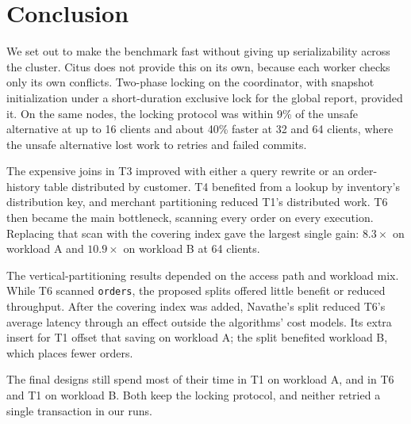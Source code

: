 \documentclass[sigconf,10pt,nonacm]{acmart}
\renewcommand{\_}{\underscorewithoutbreak\allowbreak}
\begin{document}
\section{Conclusion}
\label{sec:conclusion}

We set out to make the benchmark fast without giving up serializability across the
cluster. Citus does not provide this on its own, because each worker checks only its
own conflicts. Two-phase locking on the coordinator, with snapshot initialization under a
short-duration exclusive lock for the global report, provided it. On the same nodes, the locking protocol was within 9\%
of the unsafe alternative at up to 16 clients and about 40\% faster at 32 and 64
clients, where the unsafe alternative lost work to retries and failed commits.

The expensive joins in T3 improved with either a query rewrite or an order-history
table distributed by customer. T4 benefited from a lookup by inventory's
distribution key, and merchant partitioning reduced T1's distributed work. T6 then
became the main bottleneck, scanning every order on every execution. Replacing
that scan with the covering index gave the largest single gain: $8.3\times$ on
workload A and $10.9\times$ on workload B at 64 clients.

The vertical-partitioning results depended on the access path and workload mix.
While T6 scanned \texttt{orders}, the proposed splits offered little benefit or
reduced throughput. After the covering index was added, Navathe's split reduced
T6's average latency through an effect outside the algorithms' cost models.
Its extra insert for T1 offset that saving on workload A; the split benefited
workload B, which places fewer orders.

The final designs still spend most of their time in T1 on workload A, and in T6 and T1
on workload B. Both keep the locking protocol, and neither retried a single transaction
in our runs.



\end{document}
